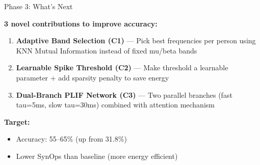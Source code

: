 \documentclass[10pt]{beamer}
\begin{document}
\begin{frame}{Phase 3: What's Next}

\small
\textbf{3 novel contributions to improve accuracy:}

\vspace{4pt}
\begin{enumerate}
  \item \textbf{Adaptive Band Selection (C1)} --- Pick best frequencies per person using KNN Mutual Information instead of fixed mu/beta bands
  \item \textbf{Learnable Spike Threshold (C2)} --- Make threshold a learnable parameter + add sparsity penalty to save energy
  \item \textbf{Dual-Branch PLIF Network (C3)} --- Two parallel branches (fast tau=5ms, slow tau=30ms) combined with attention mechanism
\end{enumerate}

\vspace{6pt}
\textbf{Target:}

\vspace{4pt}
\begin{itemize}
  \item Accuracy: 55--65\% (up from 31.8\%)
  \item Lower SynOps than baseline (more energy efficient)
\end{itemize}

\end{frame}
\end{document}
